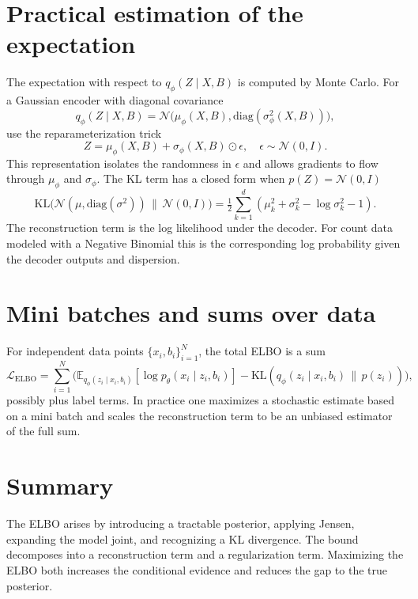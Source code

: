 \documentclass[11pt,a4paper]{article}
\begin{document}
\section{Practical estimation of the expectation}
The expectation with respect to \(q_\phi(Z \mid X,B)\) is computed by Monte Carlo. For a Gaussian encoder with diagonal covariance
\[
q_\phi(Z \mid X,B) = \mathcal{N}\!\big(\mu_\phi(X,B), \mathrm{diag}(\sigma_\phi^2(X,B))\big),
\]
use the reparameterization trick
\[
Z = \mu_\phi(X,B) + \sigma_\phi(X,B) \odot \epsilon, \quad \epsilon \sim \mathcal{N}(0,I).
\]
This representation isolates the randomness in \(\epsilon\) and allows gradients to flow through \(\mu_\phi\) and \(\sigma_\phi\). The KL term has a closed form when \(p(Z)=\mathcal{N}(0,I)\)
\[
\mathrm{KL}\!\big(\mathcal{N}(\mu,\mathrm{diag}(\sigma^2))\,\|\,\mathcal{N}(0,I)\big)
= \tfrac{1}{2}\sum_{k=1}^d \left( \mu_k^2 + \sigma_k^2 - \log \sigma_k^2 - 1 \right).
\]
The reconstruction term is the log likelihood under the decoder. For count data modeled with a Negative Binomial this is the corresponding log probability given the decoder outputs and dispersion.

\section{Mini batches and sums over data}
For independent data points \(\{x_i,b_i\}_{i=1}^N\), the total ELBO is a sum
\[
\mathcal{L}_{\text{ELBO}} = \sum_{i=1}^N
\Big(
\mathbb{E}_{q_\phi(z_i \mid x_i,b_i)}[\log p_\theta(x_i \mid z_i,b_i)]
- \mathrm{KL}(q_\phi(z_i \mid x_i,b_i)\,\|\,p(z_i))
\Big),
\]
possibly plus label terms. In practice one maximizes a stochastic estimate based on a mini batch and scales the reconstruction term to be an unbiased estimator of the full sum.

\section{Summary}
The ELBO arises by introducing a tractable posterior, applying Jensen, expanding the model joint, and recognizing a KL divergence. The bound decomposes into a reconstruction term and a regularization term. Maximizing the ELBO both increases the conditional evidence and reduces the gap to the true posterior.
\end{document}
